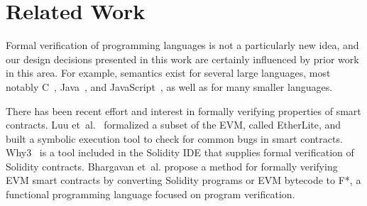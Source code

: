 \section{Related Work}
Formal verification of programming languages is not a particularly new idea,
and our design decisions presented in this work are certainly influenced by
prior work in this area. For example, \K{} semantics exist for several large languages, most notably
C~\cite{ellison-2012-thesis}, Java~\cite{bogdanas-rosu-2015-popl}, and
JavaScript~\cite{park-stefanescu-rosu-2015-pldi}, as well as for many smaller languages.


There has been recent effort and interest in formally verifying properties of
smart contracts. Luu et~al.~\cite{luumaking} formalized a subset of the EVM,
called EtherLite, and built a symbolic execution tool to check for common bugs
in smart contracts. Why3~\cite{why3} is a tool included in the Solidity IDE that supplies
formal verification of Solidity contracts. Bhargavan et~al.\cite{evmf*} propose a method for formally
verifying EVM smart contracts by converting Solidity programs or EVM bytecode to
F*, a functional programming language focused on program verification.

